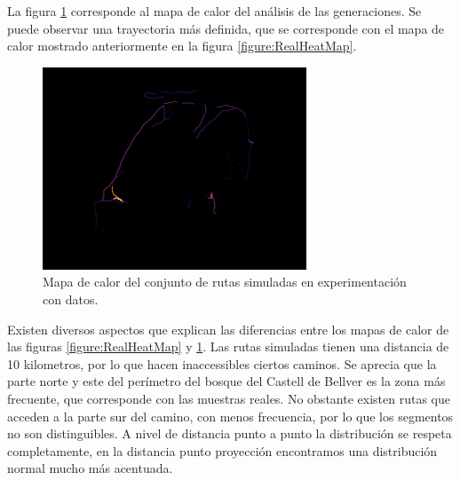 La figura \ref{figure:SimulatedHeatMap} corresponde al mapa de calor del análisis de 
las generaciones. Se puede observar una trayectoria más definida, que se corresponde 
con el mapa de calor mostrado anteriormente en la figura \ref{figure:RealHeatMap}.
\begin{figure}[!htb]
\begin{center}
\includegraphics[width=0.7\textwidth]{./Imagenes/SimulatedHeatMap1.png}
\caption{Mapa de calor del conjunto de rutas simuladas en experimentación con 
datos.}
\label{figure:SimulatedHeatMap}
\end{center}
\end{figure}
Existen diversos aspectos que explican las diferencias entre los mapas de calor de las 
figuras \ref{figure:RealHeatMap} y \ref{figure:SimulatedHeatMap}. Las rutas simuladas 
tienen una distancia de 10 kilometros, por lo que hacen inaccessibles ciertos caminos. 
Se aprecia que la parte norte y este del perímetro del bosque del Castell de Bellver es 
la zona más frecuente, que corresponde con las muestras reales. No obstante existen 
rutas que acceden a la parte sur del camino, con menos frecuencia, por lo que  los 
segmentos no son distinguibles. A nivel de distancia punto a punto la distribución se 
respeta completamente, en la distancia punto proyección encontramos una distribución 
normal mucho más acentuada.

